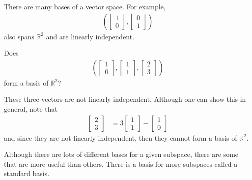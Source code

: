 \phantom{hi}

\begin{example}
There are many bases of a vector space.  For example, 
%
\begin{align*}
( \begin{bmatrix}
1 \\ 0
\end{bmatrix}, \begin{bmatrix}
0 \\1 
\end{bmatrix} )
\end{align*}
also spans $\mathbb{R}^2$ and are linearly independent.  
\end{example}

\phantom{hi}

\begin{example}
Does
\begin{align*}
( \begin{bmatrix}
1 \\ 0
\end{bmatrix}, \begin{bmatrix}
1 \\1 
\end{bmatrix},
\begin{bmatrix}
2 \\ 3
\end{bmatrix} )
\end{align*}
form a basis of $\mathbb{R}^2$?  

\solution

These three vectors are not linearly independent.  Although one can show this in general, note that
%
\begin{align*}
\begin{bmatrix}
2 \\ 3
\end{bmatrix} & = 3 \begin{bmatrix}
1 \\ 1
\end{bmatrix} - \begin{bmatrix}
1 \\ 0 
\end{bmatrix}
\end{align*}
and since they are not linearly independent, then they cannot form a basis of $\mathbb{R}^2$.  

\end{example}

Although there are lots of different bases for a given subspace, there are some that are more useful than others.  There is a basis for more subspaces called a standard basis.  


